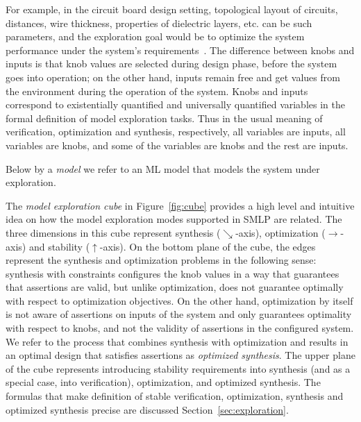 \documentclass[a4paper,parskip=half]{article} %
\begin{document}
For example, in the circuit board design setting, topological layout of circuits, distances, wire thickness, properties of dielectric layers, etc.
can be such parameters, and the exploration goal would be to optimize the system performance under the system's requirements~\cite{9501615}.
The difference between knobs and inputs is that knob values are selected during design phase, before the system goes into operation; on the other 
hand, inputs remain free and get values from the environment during the operation of the system. Knobs and inputs correspond to existentially 
quantified and universally quantified variables in the formal definition of model exploration tasks. Thus in the usual meaning of verification, optimization 
and synthesis, respectively, all variables are inputs, all variables are knobs, and some of the variables are knobs and the rest are inputs.


Below by a \emph{model} we refer to an ML model that models the system under exploration.

The \emph{model exploration cube} in Figure~\ref{fig:cube} provides a high level and intuitive idea on how the model exploration 
modes supported in SMLP are related. The three dimensions in this cube represent synthesis ($\searrow$-axis), optimization 
($\rightarrow$-axis) and stability ($\uparrow$-axis). On the bottom plane of the cube, the edges represent the synthesis and optimization 
problems in the following sense: synthesis with constraints configures the knob values in a way that guarantees that assertions are valid, 
but unlike optimization, does not guarantee optimally with respect to optimization objectives. On the other hand, optimization by itself 
is not aware of assertions on inputs of the system and only guarantees optimality with respect to knobs, and not the validity of assertions 
in the configured system. We refer to the process that combines synthesis with optimization and results in an optimal design that satisfies 
assertions as \emph{optimized synthesis}. The upper plane of the cube represents introducing stability requirements into synthesis 
(and as a special case, into verification), optimization, and optimized synthesis. The formulas that make definition of stable verification,
optimization, synthesis and optimized synthesis precise are discussed Section~\ref{sec:exploration}.
\end{document}
